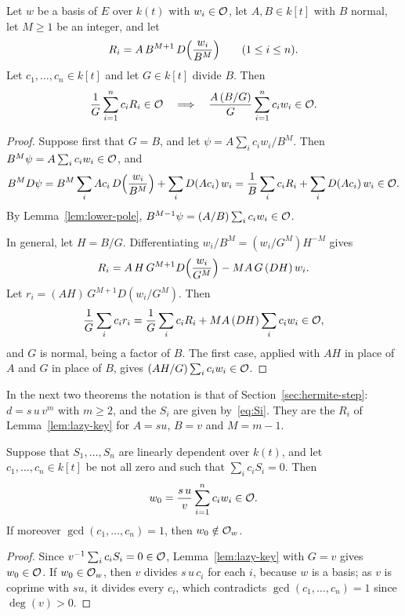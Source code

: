 \begin{lemma}\label{lem:lazy-key}
Let $w$ be a basis of $E$ over $k(t)$ with $w_i \in \mathcal{O}$, let $A, B \in k[t]$
with $B$ normal, let $M \ge 1$ be an integer, and let
\[
  R_i = A\,B^{M+1}\, D\Bigl( \frac{w_i}{B^M} \Bigr) \qquad (1 \le i \le n).
\]
Let $c_1, \dots, c_n \in k[t]$ and let $G \in k[t]$ divide $B$. Then
\[
  \frac{1}{G} \sum_{i=1}^n c_i R_i \in \mathcal{O}
  \quad\Longrightarrow\quad
  \frac{A\,(B/G)}{G} \sum_{i=1}^n c_i w_i \in \mathcal{O} .
\]
\end{lemma}

\begin{proof}
Suppose first that $G = B$, and let $\psi = A \sum_i c_i w_i / B^M$. Then $B^M \psi
= A \sum_i c_i w_i \in \mathcal{O}$, and
\[
  B^M D\psi = B^M \sum_i A c_i\, D\Bigl(\frac{w_i}{B^M}\Bigr) + \sum_i D(A c_i)\, w_i
         = \frac{1}{B} \sum_i c_i R_i + \sum_i D(A c_i)\, w_i \in \mathcal{O} .
\]
By Lemma~\ref{lem:lower-pole}, $B^{M-1} \psi = (A/B) \sum_i c_i w_i \in \mathcal{O}$.

In general, let $H = B/G$. Differentiating $w_i / B^M = (w_i / G^M) H^{-M}$
gives
\[
  R_i = A\,H\,G^{M+1} D\Bigl(\frac{w_i}{G^M}\Bigr) - M A\, G\, (DH)\, w_i .
\]
Let $r_i = (AH)\, G^{M+1} D(w_i / G^M)$. Then
\[
  \frac{1}{G} \sum_i c_i r_i
  = \frac{1}{G} \sum_i c_i R_i + M A\, (DH) \sum_i c_i w_i \in \mathcal{O} ,
\]
and $G$ is normal, being a factor of $B$. The first case, applied with $AH$
in place of $A$ and $G$ in place of $B$, gives $(AH/G) \sum_i c_i w_i \in
\mathcal{O}$.
\end{proof}

In the next two theorems the notation is that of
Section~\ref{sec:hermite-step}: $d = s\,u\,v^m$ with $m \ge 2$, and the $S_i$
are given by~\eqref{eq:Si}. They are the $R_i$ of Lemma~\ref{lem:lazy-key}
for $A = s u$, $B = v$ and $M = m - 1$.

\begin{theorem}\label{thm:lazy-dependent}
Suppose that $S_1, \dots, S_n$ are linearly dependent over $k(t)$, and let
$c_1, \dots, c_n \in k[t]$ be not all zero and such that $\sum_i c_i S_i = 0$.
Then
\[
  w_0 = \frac{s\,u}{v} \sum_{i=1}^n c_i w_i \in \mathcal{O} .
\]
If moreover $\gcd(c_1, \dots, c_n) = 1$, then $w_0 \notin \mathcal{O}_w$.
\end{theorem}

\begin{proof}
Since $v^{-1} \sum_i c_i S_i = 0 \in \mathcal{O}$, Lemma~\ref{lem:lazy-key} with $G =
v$ gives $w_0 \in \mathcal{O}$. If $w_0 \in \mathcal{O}_w$, then $v$ divides $s\,u\,c_i$ for
each $i$, because $w$ is a basis; as $v$ is coprime with $s u$, it divides
every $c_i$, which contradicts $\gcd(c_1, \dots, c_n) = 1$ since $\deg(v) >
0$.
\end{proof}

